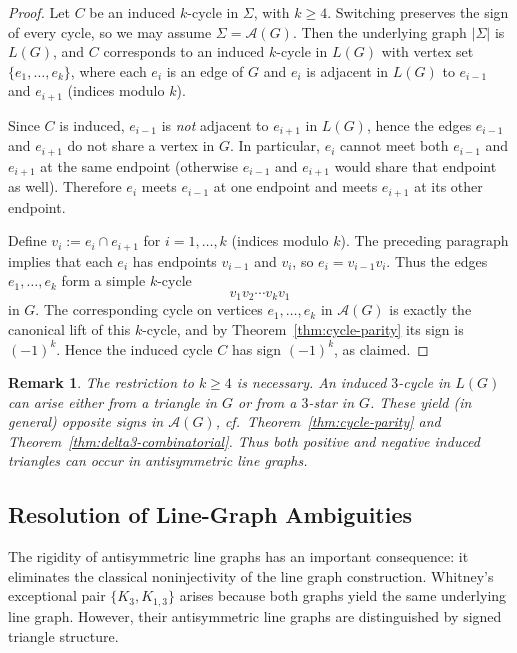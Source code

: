 \documentclass[11pt]{article}
\newtheorem{remark}{Remark}
\theoremstyle{plain}
\begin{document}
\begin{proof}
Let $C$ be an induced $k$-cycle in $\Sigma$, with $k\ge 4$. Switching preserves the sign
of every cycle, so we may assume $\Sigma=\mathcal A(G)$. Then the underlying graph
$|\Sigma|$ is $L(G)$, and $C$ corresponds to an induced $k$-cycle in $L(G)$ with vertex set
$\{e_1,\dots,e_k\}$, where each $e_i$ is an edge of $G$ and $e_i$ is adjacent in $L(G)$ to
$e_{i-1}$ and $e_{i+1}$ (indices modulo $k$).

Since $C$ is induced, $e_{i-1}$ is \emph{not} adjacent to $e_{i+1}$ in $L(G)$, hence the
edges $e_{i-1}$ and $e_{i+1}$ do not share a vertex in $G$. In particular, $e_i$ cannot
meet both $e_{i-1}$ and $e_{i+1}$ at the same endpoint (otherwise $e_{i-1}$ and $e_{i+1}$
would share that endpoint as well). Therefore $e_i$ meets $e_{i-1}$ at one endpoint and
meets $e_{i+1}$ at its other endpoint.

Define $v_i := e_i\cap e_{i+1}$ for $i=1,\dots,k$ (indices modulo $k$). The preceding
paragraph implies that each $e_i$ has endpoints $v_{i-1}$ and $v_i$, so $e_i=v_{i-1}v_i$.
Thus the edges $e_1,\dots,e_k$ form a simple $k$-cycle
\[
v_1v_2\cdots v_kv_1
\]
in $G$. The corresponding cycle on vertices $e_1,\dots,e_k$ in $\mathcal A(G)$ is exactly
the canonical lift of this $k$-cycle, and by Theorem~\ref{thm:cycle-parity} its sign is
$(-1)^k$. Hence the induced cycle $C$ has sign $(-1)^k$, as claimed.
\end{proof}

\begin{remark}
The restriction to $k\ge 4$ is necessary. An induced $3$-cycle in $L(G)$ can arise either
from a triangle in $G$ or from a $3$-star in $G$. These yield (in general) opposite signs in
$\mathcal A(G)$, cf.\ Theorem~\ref{thm:cycle-parity} and
Theorem~\ref{thm:delta3-combinatorial}. Thus both positive and negative induced triangles
can occur in antisymmetric line graphs.
\end{remark}


\subsection{Resolution of Line-Graph Ambiguities}

The rigidity of antisymmetric line graphs has an important consequence: it
eliminates the classical noninjectivity of the line graph construction.
Whitney’s exceptional pair $\{K_3,K_{1,3}\}$ arises because both graphs yield the
same underlying line graph.
However, their antisymmetric line graphs are distinguished by signed triangle
structure.
\end{document}
